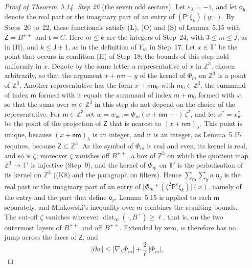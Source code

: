 \documentclass[11pt,letterpaper,reqno]{amsart}
\theoremstyle{definition}
\begin{document}
\begin{proof}[Proof of Theorem~5.14]
\emph{Step 26} (the seven odd sectors).
Let $\varepsilon_\lambda=-1$, and let $\mathsf o_y$ denote the real part or the imaginary part of an entry of $(\mathsf P^\varepsilon\xi_k)(y;\cdot)$.
By Steps~20 to~22, these functionals satisfy (L), (O) and (S) of Lemma~5.15 with $\mathsf Z=B^{++}$ and $\mathsf t=C$.
Here $m\le k$ are the integers of Step~24, with $3\le m\le\mathsf J$, as in (H), and $k\le\mathsf J+1$, as in the definition of $Y_m$ in Step~17.
Let $x\in\mathbb T'$ be the point that occurs in condition (H) of Step~18; the bounds of this step hold uniformly in $x$.
Denote by the same letter a representative of $x$ in $\mathbb Z^3$, chosen arbitrarily, so that the argument $x+\mathsf n\mathsf m-y$ of the kernel of $\Phi_m$ on $\mathbb Z^3$ is a point of $\mathbb Z^3$.
Another representative has the form $x+\mathsf n\mathsf m_0$ with $\mathsf m_0\in\mathbb Z^3$; the summand of index $\mathsf m$ formed with it equals the summand of index $\mathsf m+\mathsf m_0$ formed with $x$, so that the sums over $\mathsf m\in\mathbb Z^3$ in this step do not depend on the choice of the representative.
For $\mathsf m\in\mathbb Z^3$ set $w=w_{\mathsf m}:=\Phi_m(x+\mathsf n\mathsf m-\cdot)\,\zeta^2$, and let $x^*=x^*_{\mathsf m}$ be the point of the projection of $\mathsf Z$ that is nearest to $(x+\mathsf n\mathsf m)_\lambda$.
This point is unique, because $(x+\mathsf n\mathsf m)_\lambda$ is an integer, and it is an integer, as Lemma~5.15 requires, because $\mathsf Z\subset\mathbb Z^3$.
As the symbol of $\Phi_m$ is real and even, its kernel is real, and so is $\zeta$; moreover $\zeta$ vanishes off $B^{++}$, a box of $\mathbb Z^3$ on which the quotient map $\mathbb Z^3\to\mathbb T'$ is injective (Step~9), and the kernel of $\Phi_m$ on $\mathbb T'$ is the periodisation of its kernel on $\mathbb Z^3$ ((K8) and the paragraph on filters).
Hence $\sum_{\mathsf m}\sum_yw\,\mathsf o_y$ is the real part or the imaginary part of an entry of $\bigl[\Phi_m*(\zeta^2\mathsf P^\varepsilon\xi_k)\bigr](x)$, namely of the entry and the part that define $\mathsf o_y$.
Lemma~5.15 is applied to each $\mathsf m$ separately, and Minkowski's inequality over $\mathsf m$ combines the resulting bounds.
The cut-off $\zeta$ vanishes wherever $\operatorname{dist}_\infty(\cdot,B^+)\ge\ell$, that is, on the two outermost layers of $B^{++}$ and off $B^{++}$.
Extended by zero, $w$ therefore has no jump across the faces of $\mathsf Z$, and
\begin{equation*}
|\partial w|\le|\nabla_\lambda\Phi_m|+\frac2\ell\,|\Phi_m|,
\end{equation*}

\end{proof}
\end{document}
